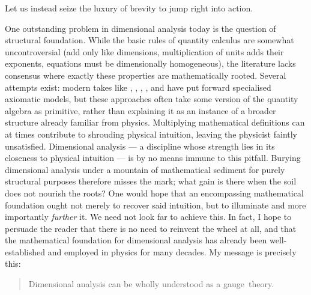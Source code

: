 \documentclass[12pt]{article}
\numberwithin{equation}{section}
\begin{document}
Let us instead seize the luxury of brevity to jump right into action.

One outstanding problem in dimensional analysis today is the question of structural foundation. While the basic rules of quantity calculus are somewhat uncontroversial (add only like dimensions, multiplication of units adds their exponents, equations must be dimensionally homogeneous), the literature lacks consensus where exactly these properties are mathematically rooted. Several attempts exist: modern takes like \citet{Janyska2007, Janyska2010}, \citet{Tao2012}, \citet{Domotor2017}, \citet{Raposo2018}, and \citet{Zapata2022} have put forward specialised axiomatic models, but these approaches often take some version of the quantity algebra as primitive, rather than explaining it as an instance of a broader structure already familiar from physics. Multiplying mathematical definitions can at times contribute to shrouding physical intuition, leaving the physicist faintly unsatisfied. Dimensional analysis --- a discipline whose strength lies in its closeness to physical intuition --- is by no means immune to this pitfall. Burying dimensional analysis under a mountain of mathematical sediment for purely structural purposes therefore misses the mark; what gain is there when the soil does not nourish the roots? One would hope that an encompassing mathematical foundation ought not merely to recover said intuition, but to illuminate and more importantly \emph{further} it. We need not look far to achieve this. In fact, I hope to persuade the reader that there is no need to reinvent the wheel at all, and that the mathematical foundation for dimensional analysis has already been well-established and employed in physics for many decades. My message is precisely this: 

\vspace{6pt}
\begin{quote}
    Dimensional analysis can be wholly understood as a gauge~theory. 
\end{quote}
\vspace{6pt}
\end{document}
